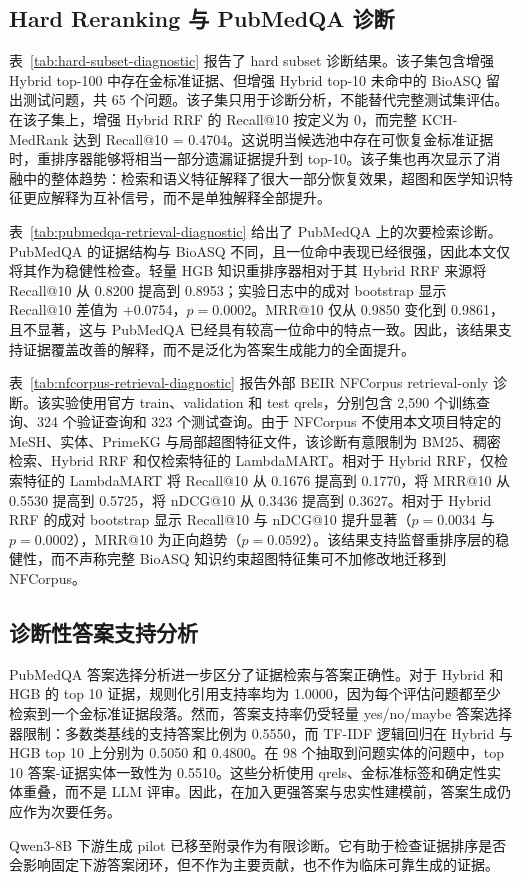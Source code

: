 \subsection{Hard Reranking 与 PubMedQA 诊断}

表~\ref{tab:hard-subset-diagnostic} 报告了 hard subset 诊断结果。该子集包含增强 Hybrid top-100 中存在金标准证据、但增强 Hybrid top-10 未命中的 BioASQ 留出测试问题，共 65 个问题。该子集只用于诊断分析，不能替代完整测试集评估。在该子集上，增强 Hybrid RRF 的 Recall@10 按定义为 0，而完整 KCH-MedRank 达到 Recall@10 = 0.4704。这说明当候选池中存在可恢复金标准证据时，重排序器能够将相当一部分遗漏证据提升到 top-10。该子集也再次显示了消融中的整体趋势：检索和语义特征解释了很大一部分恢复效果，超图和医学知识特征更应解释为互补信号，而不是单独解释全部提升。



表~\ref{tab:pubmedqa-retrieval-diagnostic} 给出了 PubMedQA 上的次要检索诊断。PubMedQA 的证据结构与 BioASQ 不同，且一位命中表现已经很强，因此本文仅将其作为稳健性检查。轻量 HGB 知识重排序器相对于其 Hybrid RRF 来源将 Recall@10 从 0.8200 提高到 0.8953；实验日志中的成对 bootstrap 显示 Recall@10 差值为 +0.0754，$p=0.0002$。MRR@10 仅从 0.9850 变化到 0.9861，且不显著，这与 PubMedQA 已经具有较高一位命中的特点一致。因此，该结果支持证据覆盖改善的解释，而不是泛化为答案生成能力的全面提升。



表~\ref{tab:nfcorpus-retrieval-diagnostic} 报告外部 BEIR NFCorpus retrieval-only 诊断。该实验使用官方 train、validation 和 test qrels，分别包含 2,590 个训练查询、324 个验证查询和 323 个测试查询。由于 NFCorpus 不使用本文项目特定的 MeSH、实体、PrimeKG 与局部超图特征文件，该诊断有意限制为 BM25、稠密检索、Hybrid RRF 和仅检索特征的 LambdaMART。相对于 Hybrid RRF，仅检索特征的 LambdaMART 将 Recall@10 从 0.1676 提高到 0.1770，将 MRR@10 从 0.5530 提高到 0.5725，将 nDCG@10 从 0.3436 提高到 0.3627。相对于 Hybrid RRF 的成对 bootstrap 显示 Recall@10 与 nDCG@10 提升显著（$p=0.0034$ 与 $p=0.0002$），MRR@10 为正向趋势（$p=0.0592$）。该结果支持监督重排序层的稳健性，而不声称完整 BioASQ 知识约束超图特征集可不加修改地迁移到 NFCorpus。



\subsection{诊断性答案支持分析}

PubMedQA 答案选择分析进一步区分了证据检索与答案正确性。对于 Hybrid 和 HGB 的 top 10 证据，规则化引用支持率均为 1.0000，因为每个评估问题都至少检索到一个金标准证据段落。然而，答案支持率仍受轻量 yes/no/maybe 答案选择器限制：多数类基线的支持答案比例为 0.5550，而 TF-IDF 逻辑回归在 Hybrid 与 HGB top 10 上分别为 0.5050 和 0.4800。在 98 个抽取到问题实体的问题中，top 10 答案-证据实体一致性为 0.5510。这些分析使用 qrels、金标准标签和确定性实体重叠，而不是 LLM 评审。因此，在加入更强答案与忠实性建模前，答案生成仍应作为次要任务。

Qwen3-8B 下游生成 pilot 已移至附录作为有限诊断。它有助于检查证据排序是否会影响固定下游答案闭环，但不作为主要贡献，也不作为临床可靠生成的证据。
